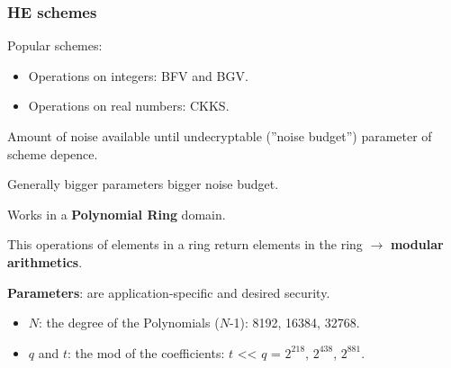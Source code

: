 \documentclass[10pt,handout]{beamer}
\begin{document}
\begin{frame}
    \frametitle{HE schemes}

Popular schemes:
 \vspace{-0.25cm}
\begin{itemize}\itemsep-0.9em
    \item Operations on integers: BFV and BGV.
    \item Operations on real numbers: CKKS.
\end{itemize}

    Amount of noise available until undecryptable (''noise budget'') parameter of scheme depence.

Generally bigger parameters bigger noise budget.

    Works in a \textbf{Polynomial Ring} domain.


\pause
 \vspace{-0.25cm}
    This operations of elements in a ring return elements in the ring $\rightarrow$  \textbf{modular arithmetics}.

 \vspace{-0.25cm}
\textbf{Parameters}: are application-specific and desired security.

\pause
 \vspace{-0.3cm}
\begin{itemize}\itemsep-0.9em
    \item $N$: the degree of the Polynomials ($N$-1):  8192, 16384, 32768.
\pause
    \item $q$ and $t$: the mod of the coefficients: $t$ << $q$ = $2^{218}$,   $2^{438}$,  $2^{881}$.
\end{itemize}
\end{frame}
\end{document}
